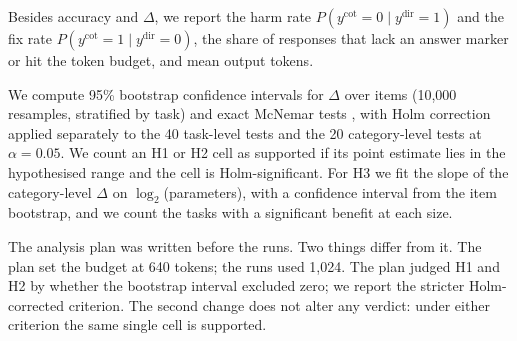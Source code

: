 Besides accuracy and $\Delta$, we report the harm rate $P(y^{\mathrm{cot}}=0 \mid y^{\mathrm{dir}}=1)$ and the fix rate $P(y^{\mathrm{cot}}=1 \mid y^{\mathrm{dir}}=0)$, the share of \CoT responses that lack an answer marker or hit the token budget, and mean output tokens.

We compute 95\% bootstrap confidence intervals for $\Delta$ over items (10,000 resamples, stratified by task) and exact McNemar tests \cite{mcnemar1947note}, with Holm correction \cite{holm1979simple} applied separately to the 40 task-level tests and the 20 category-level tests at $\alpha = 0.05$.
We count an H1 or H2 cell as supported if its point estimate lies in the hypothesised range and the cell is Holm-significant.
For H3 we fit the slope of the category-level $\Delta$ on $\log_2$(parameters), with a confidence interval from the item bootstrap, and we count the tasks with a significant benefit at each size.

The analysis plan was written before the runs. Two things differ from it.
The plan set the \CoT budget at 640 tokens; the runs used 1,024.
The plan judged H1 and H2 by whether the bootstrap interval excluded zero; we report the stricter Holm-corrected criterion.
The second change does not alter any verdict: under either criterion the same single cell is supported.
